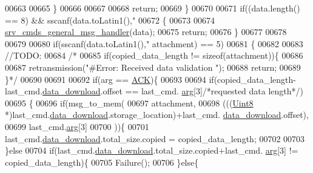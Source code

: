 \begin{DoxyCode}
00663 
00665                  \}
00666 
00667 
00668             \textcolor{keywordflow}{return};
00669          \}
00670 
00671         \textcolor{keywordflow}{if}((data.length() == 8) && sscanf(data.toLatin1(),\textcolor{stringliteral}{"%
00672         \{
00673 
00674             \hyperlink{a00006_a8a8cd34488e8ee213350afb5b2261677}{srv\_cmds\_general\_msg\_handler}(data);
00675             \textcolor{keywordflow}{return};
00676         \}
00677        
00678         
00679 
00680         \textcolor{keywordflow}{if}(sscanf(data.toLatin1(),\textcolor{stringliteral}{"%
      attachment) == 5)
00681         \{
00682 
00683             \textcolor{comment}{//TODO:}
00684            \textcolor{comment}{/*}
00685 \textcolor{comment}{           if(copied\_data\_length != sizeof(attachment))\{}
00686 \textcolor{comment}{}
00687 \textcolor{comment}{               retransmission("#Error: Received data  validation ");}
00688 \textcolor{comment}{               return;}
00689 \textcolor{comment}{           \}*/}
00690 
00691 
00692            \textcolor{keywordflow}{if}(arg == \hyperlink{a00034_a6f6489887e08bff4887d0bc5dcf214d8}{ACK})\{
00693 
00694                \textcolor{keywordflow}{if}(copied\_data\_length-last\_cmd.\hyperlink{a00001_a5cfeaed4d4f8e51070a324c0ba893ebe}{data\_download}.offset == last\_cmd.
      \hyperlink{a00001_a56e6c2d7315d0ae60a51e8b140c9cfe4}{arg}[3]\textcolor{comment}{/*requested data length*/})
00695                \{
00696                \textcolor{keywordflow}{if}(msg\_to\_mem(
00697                       attachment,
00698                       (((\hyperlink{a00001_a979e3e23b9a449e69ab6a8a83b6042f8}{Uint8} *)last\_cmd.\hyperlink{a00001_a5cfeaed4d4f8e51070a324c0ba893ebe}{data\_download}.storage\_location)+last\_cmd.
      \hyperlink{a00001_a5cfeaed4d4f8e51070a324c0ba893ebe}{data\_download}.offset),
00699                       last\_cmd.\hyperlink{a00001_a56e6c2d7315d0ae60a51e8b140c9cfe4}{arg}[3]
00700                           ))\{
00701                    last\_cmd.\hyperlink{a00001_a5cfeaed4d4f8e51070a324c0ba893ebe}{data\_download}.total\_size.copied = copied\_data\_length;
00702 
00703                   \}\textcolor{keywordflow}{else}
00704                   \textcolor{keywordflow}{if}(last\_cmd.\hyperlink{a00001_a5cfeaed4d4f8e51070a324c0ba893ebe}{data\_download}.total\_size.copied+last\_cmd.
      \hyperlink{a00001_a56e6c2d7315d0ae60a51e8b140c9cfe4}{arg}[3] != copied\_data\_length)\{
00705                     Failure();
00706                   \}\textcolor{keywordflow}{else}\{
}}
\end{DoxyCode}
